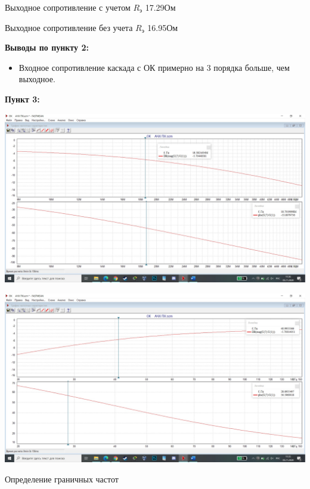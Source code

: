 \documentclass[a4paper,14pt]{extarticle}
\begin{document}
    Выходное сопротивление с учетом $R_{\text{э}}$ 17.29Ом

    Выходное сопротивление без учета $R_{\text{э}}$ 16.95Ом

    \textbf{Выводы по пункту 2:}
    \vspace{-6ex}
    \begin{singlespace}
        \begin{itemize}
            \item Входное сопротивление каскада с ОК примерно на 3 порядка больше, чем выходное.
        \end{itemize}
    \end{singlespace}

    \newpage 
    \textbf{Пункт 3:}
    \begin{center}
        \includegraphics[scale=0.25]{3.3.jpg}
    \end{center}
    \begin{center}
        \includegraphics[scale=0.25]{3.2.jpg}
    \end{center}
    \begin{center}
        Определение граничных частот
    \end{center}
\end{document}
